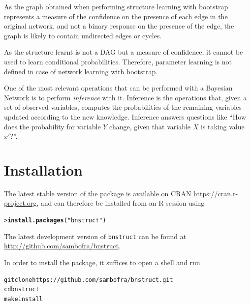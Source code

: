 \documentclass{article}\usepackage[]{graphicx}\usepackage[]{color}
\makeatletter
\newcommand{\hlstr}[1]{\textcolor[rgb]{0.192,0.494,0.8}{#1}}%
\newcommand{\hlstd}[1]{\textcolor[rgb]{0.345,0.345,0.345}{#1}}%
\newcommand{\hlkwd}[1]{\textcolor[rgb]{0.737,0.353,0.396}{\textbf{#1}}}%
\newenvironment{kframe}{%
 \def\at@end@of@kframe{}%
 \ifinner\ifhmode%
  \def\at@end@of@kframe{\end{minipage}}%
  \begin{minipage}{\columnwidth}%
 \fi\fi%
 \def\FrameCommand##1{\hskip\@totalleftmargin \hskip-\fboxsep
 \colorbox{shadecolor}{##1}\hskip-\fboxsep
     \hskip-\linewidth \hskip-\@totalleftmargin \hskip\columnwidth}%
 \MakeFramed {\advance\hsize-\width
   \@totalleftmargin\z@ \linewidth\hsize
   \@setminipage}}%
 {\par\unskip\endMakeFramed%
 \at@end@of@kframe}
\newenvironment{knitrout}{}{} %
\newcommand{\Rpackage}[1]{{\texttt{#1}}}
\makeatother
\begin{document}
As the graph obtained when performing structure learning with bootstrap represents a measure of the confidence
on the presence of each edge in the original network, and not a binary response on the presence of the edge,
the graph is likely to contain undirected edges or cycles.

As the structure learnt is not a DAG but a measure of confidence, it cannot be used to learn conditional probabilities.
Therefore, parameter learning is not defined in case of network learning with bootstrap.

One of the most relevant operations that can be performed with a Bayesian Network is to perform \emph{inference} with it.
Inference is the operations that, given a set of observed variables, computes the probabilities of the remaining variables
updated according to the new knowledge. Inference answers questions like ``How does the probability for variable
$Y$ change, given that variable $X$ is taking value $x\prime$?''.

\section{Installation}
The latest stable version of the package is available on CRAN \url{https://cran.r-project.org},
and can therefore be installed from an R session using
\begin{knitrout}
\color{fgcolor}\begin{kframe}
\begin{alltt}
\hlstd{> }\hlkwd{install.packages}\hlstd{(}\hlstr{"bnstruct"}\hlstd{)}
\end{alltt}
\end{kframe}
\end{knitrout}

The latest development version of \Rpackage{bnstruct} can be found at \url{http://github.com/sambofra/bnstruct}.

In order to install the package, it suffices to open a shell and run
\begin{knitrout}
\color{fgcolor}\begin{kframe}
\begin{alltt}
git clone https://github.com/sambofra/bnstruct.git
cd bnstruct
make install
\end{alltt}
\end{kframe}
\end{knitrout}
\end{document}
